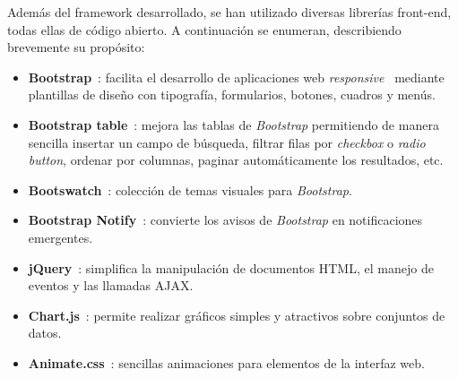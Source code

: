 Además del \gls{framework} desarrollado, se han utilizado diversas librerías \gls{front-end}, todas ellas de código abierto. A continuación se enumeran, describiendo brevemente su propósito:

\begin{itemize}
  \item \textbf{Bootstrap}~\cite{bootstrap}: facilita el desarrollo de aplicaciones web \textit{responsive}~\cite{responsive} mediante plantillas de diseño con tipografía, formularios, botones, cuadros y menús.

  \item \textbf{Bootstrap table}~\cite{bootstraptable}: mejora las tablas de \textit{Bootstrap} permitiendo de manera sencilla insertar un campo de búsqueda, filtrar filas por \textit{checkbox} o \textit{radio button}, ordenar por columnas, paginar automáticamente los resultados, etc.

  \item \textbf{Bootswatch}~\cite{bootswatch}: colección de temas visuales para \textit{Bootstrap}.

  \item \textbf{Bootstrap Notify}~\cite{bootstrapnotify}: convierte los avisos de \textit{Bootstrap} en notificaciones emergentes.

  \item \textbf{jQuery}~\cite{jquery}: simplifica la manipulación de documentos \gls{HTML}, el manejo de eventos y las llamadas \gls{AJAX}.

  \item \textbf{Chart.js}~\cite{chartjs}: permite realizar gráficos simples y atractivos sobre conjuntos de datos.

  \item \textbf{Animate.css}~\cite{animatecss}: sencillas animaciones para elementos de la interfaz web.

\end{itemize}
